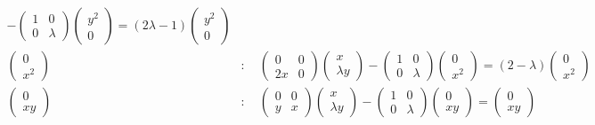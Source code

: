 \documentclass{article}
\begin{document}
\begin{align*}
-
\begin{pmatrix} 1 & 0 \\ 0 & \lambda \end{pmatrix}
\begin{pmatrix} y^2 \\ 0 \end{pmatrix}
= (2\lambda - 1) \begin{pmatrix} y^2 \\ 0 \end{pmatrix}\\
\begin{pmatrix} 0 \\ x^2 \end{pmatrix}&: \quad
\begin{pmatrix} 0 & 0 \\ 2x & 0 \end{pmatrix}
\begin{pmatrix} x \\ \lambda y \end{pmatrix}
-
\begin{pmatrix} 1 & 0 \\ 0 & \lambda \end{pmatrix}
\begin{pmatrix} 0 \\ x^2 \end{pmatrix}
= (2 - \lambda) \begin{pmatrix} 0 \\ x^2 \end{pmatrix}\\
\begin{pmatrix} 0 \\ xy \end{pmatrix}&: \quad
\begin{pmatrix} 0 & 0 \\ y & x \end{pmatrix}
\begin{pmatrix} x \\ \lambda y \end{pmatrix}
-
\begin{pmatrix} 1 & 0 \\ 0 & \lambda \end{pmatrix}
\begin{pmatrix} 0 \\ xy \end{pmatrix}
=
\begin{pmatrix} 0 \\ xy \end{pmatrix}\\

\end{align*}
\end{document}
